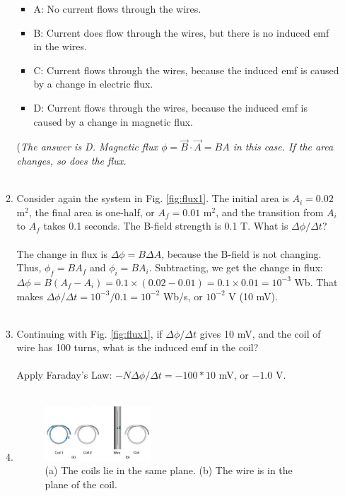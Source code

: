 \documentclass[10pt]{article}
\begin{document}
\begin{enumerate}
\begin{enumerate}
\begin{itemize}
\item A: No current flows through the wires.
\item B: Current does flow through the wires, but there is no induced emf in the wires.
\item C: Current flows through the wires, because the induced emf is caused by a change in electric flux.
\item D: Current flows through the wires, because the induced emf is caused by a change in magnetic flux.
\end{itemize}
(\textit{The answer is D. Magnetic flux $\phi = \vec{B} \cdot \vec{A} = BA$ in this case.  If the area changes, so does the flux.} \\ \\
\item Consider again the system in Fig. \ref{fig:flux1}.  The initial area is $A_i = 0.02$ m$^2$, the final area is one-half, or $A_f = 0.01$ m$^2$, and the transition from $A_i$ to $A_f$ takes 0.1 seconds.  The B-field strength is 0.1 T.  What is $\Delta \phi / \Delta t$? \\ \\
The change in flux is $\Delta \phi = B\Delta A$, because the B-field is not changing.  Thus, $\phi_f = BA_f$ and $\phi_i = BA_i$.  Subtracting, we get the change in flux: $\Delta \phi = B(A_f - A_i) = 0.1\times (0.02 - 0.01) = 0.1 \times 0.01 = 10^{-3}$ Wb.  That makes $\Delta \phi/\Delta t = 10^{-3}/0.1 = 10^{-2}$ Wb/s, or $10^{-2}$ V (10 mV). \\ \\
\item Continuing with Fig. \ref{fig:flux1}, if $\Delta \phi / \Delta t$ gives 10 mV, and the coil of wire has 100 turns, what is the induced emf in the coil? \\ \\ Apply Faraday's Law: $-N\Delta \phi /\Delta t = -100 * 10$ mV, or $-1.0$ V. \\ \\
\item
\begin{figure}
\centering
\includegraphics[width=0.4\textwidth]{flux2.png}
\caption{\label{fig:flux2} (a) The coils lie in the same plane. (b) The wire is in the plane of the coil.}

\end{figure}
\end{enumerate}
\end{enumerate}
\end{document}
